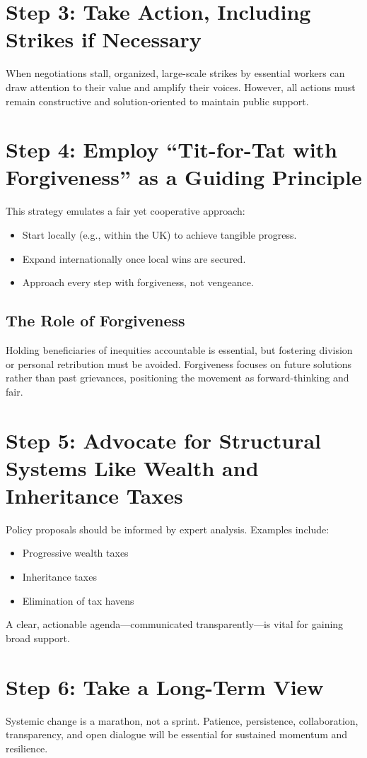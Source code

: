 \documentclass[11pt,a4paper]{article}
\begin{document}
\section{Step 3: Take Action, Including Strikes if Necessary}
When negotiations stall, organized, large-scale strikes by essential workers can draw attention to their value and amplify their voices. However, all actions must remain constructive and solution-oriented to maintain public support.

\section{Step 4: Employ ``Tit-for-Tat with Forgiveness'' as a Guiding Principle}
This strategy emulates a fair yet cooperative approach:
\begin{itemize}
  \item Start locally (e.g., within the UK) to achieve tangible progress.
  \item Expand internationally once local wins are secured.
  \item Approach every step with forgiveness, not vengeance.
\end{itemize}

\subsection{The Role of Forgiveness}
Holding beneficiaries of inequities accountable is essential, but fostering division or personal retribution must be avoided. Forgiveness focuses on future solutions rather than past grievances, positioning the movement as forward-thinking and fair.

\section{Step 5: Advocate for Structural Systems Like Wealth and Inheritance Taxes}
Policy proposals should be informed by expert analysis. Examples include:
\begin{itemize}
  \item Progressive wealth taxes
  \item Inheritance taxes
  \item Elimination of tax havens
\end{itemize}
A clear, actionable agenda—communicated transparently—is vital for gaining broad support.

\section{Step 6: Take a Long-Term View}
Systemic change is a marathon, not a sprint. Patience, persistence, collaboration, transparency, and open dialogue will be essential for sustained momentum and resilience.
\end{document}
